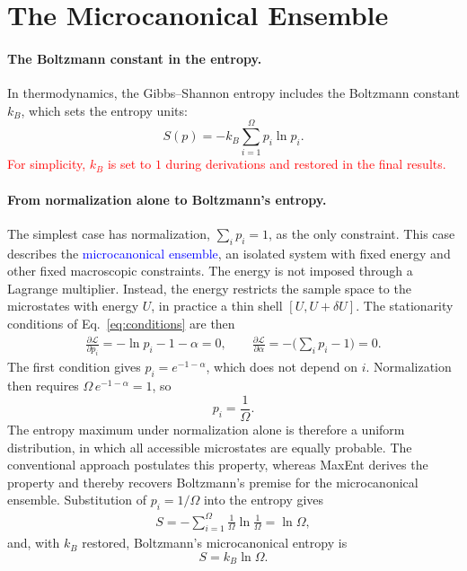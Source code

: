 \section{The Microcanonical Ensemble}

\paragraph{The Boltzmann constant in the entropy.}
In thermodynamics, the Gibbs--Shannon entropy includes the Boltzmann
constant $k_B$, which sets the entropy units:
\begin{equation}
    \boxed{S(p) = -k_B\sum_{i=1}^{\Omega} p_i\ln p_i.}
\end{equation}
\textcolor{red}{For simplicity, $k_B$ is set to $1$ during derivations and
restored in the final results.}

\paragraph{From normalization alone to Boltzmann's entropy.}
The simplest case has normalization, $\sum_i p_i=1$, as the only
constraint. This case describes the \textcolor{blue}{microcanonical
ensemble}, an isolated system with fixed energy and other fixed macroscopic
constraints. The energy is not imposed through a Lagrange multiplier.
Instead, the energy restricts the sample space to the microstates with
energy $U$, in practice a thin shell $[U,U+\delta U]$. The stationarity
conditions of Eq.~\eqref{eq:conditions} are then
\begin{align*}
    \frac{\partial\mathcal{L}}{\partial p_i} = -\ln p_i-1-\alpha = 0,
    \qquad
    \frac{\partial\mathcal{L}}{\partial\alpha} = -\Big(\sum_i p_i-1\Big) = 0.
\end{align*}
The first condition gives $p_i=e^{-1-\alpha}$, which does not depend on $i$.
Normalization then requires $\Omega\, e^{-1-\alpha}=1$, so
\begin{equation}
    \boxed{p_i = \frac{1}{\Omega}.}
\end{equation}
The entropy maximum under normalization alone is therefore a uniform
distribution, in which all accessible microstates are equally probable. The
conventional approach postulates this property, whereas MaxEnt derives the
property and thereby recovers Boltzmann's premise for the microcanonical
ensemble. Substitution of $p_i=1/\Omega$ into the entropy gives
\begin{align*}
    S = -\sum_{i=1}^{\Omega}\frac{1}{\Omega}\ln\frac{1}{\Omega} = \ln\Omega,
\end{align*}
and, with $k_B$ restored, Boltzmann's microcanonical entropy is
\begin{equation}
    \boxed{S = k_B\ln\Omega.}
\end{equation}

